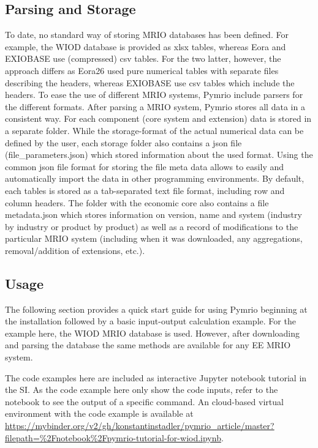 \documentclass{jors}
\begin{document}
{\subsection*{Parsing and Storage}

To date, no standard way of storing MRIO databases has been defined.
For example, the WIOD database is provided as xlsx tables, whereas Eora and EXIOBASE use (compressed) csv tables.
For the two latter, however, the approach differs as Eora26 used pure numerical tables with separate files describing the headers, whereas EXIOBASE use csv tables which include the headers.
To ease the use of different MRIO systems, Pymrio include parsers for the different formats.
After parsing a MRIO system, Pymrio stores all data in a consistent way.
For each component (core system and extension) data is stored in a separate folder.
While the storage-format of the actual numerical data can be defined by the user, each storage folder also contains a json file (file\_parameters.json) which stored information about the used format. 
Using the common json file format for storing the file meta data  allows to easily and automatically import the data in other programming environments. 
By default, each tables is stored as a tab-separated text file format, including row and column headers.
The folder with the economic core also contains a file metadata.json which stores information on version, name and system (industry by industry or product by product) as well as a record of modifications to the particular MRIO system (including when it was downloaded, any aggregations, removal/addition of extensions, etc.). 

\subsection*{Usage}

The following section provides a quick start guide for using Pymrio beginning at the installation followed by a basic input-output calculation example.
For the example here, the WIOD MRIO database \cite{timmer2015} is used. 
However, after downloading and parsing the database the same methods are available for any EE MRIO system.

The code examples here are included as interactive Jupyter notebook  tutorial in the SI.
As the code example here only show the code inputs, refer to the notebook to see the output of a specific command. 
An cloud-based virtual environment with the code example is available at \url{https://mybinder.org/v2/gh/konstantinstadler/pymrio_article/master?filepath=%2Fnotebook%2Fpymrio-tutorial-for-wiod.ipynb}.

}
\end{document}
